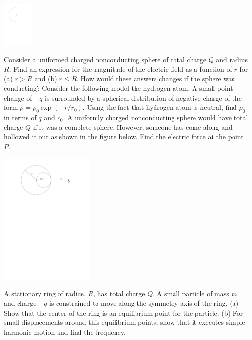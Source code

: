 \documentclass[12pt]{article}
\begin{document}
\includegraphics[width=0.12\textwidth]{semicircle.pdf}


\newpage
\noindent Consider a uniformed charged nonconducting sphere of total charge $Q$ and radius $R$.  Find an expression for the magnitude of the electric field as a function of $r$ for (a) $r>R$ and (b) $r\le R$.  How would these answers changes if the sphere was conducting?
\newpage
\noindent Consider the following model the hydrogen atom.  A small point change of $+q$ is surrounded by a spherical distribution of negative charge of the form $\rho = \rho_0 \exp(-r/r_0)$.  Using the fact that hydrogen atom is neutral, find $\rho_0$ in terms of $q$ and $r_0$.
\newpage
\noindent A uniformly charged nonconducting sphere would have total charge $Q$ if it was a complete sphere.  However, someone has come along and hollowed it out as shown in the figure below.  Find the electric force at the point $P$.

\includegraphics[width=0.35\textwidth]{sphere.pdf}

\newpage
\noindent A stationary ring of radius, $R$, has total charge $Q$.  A small particle of mass $m$ and charge $-q$ is constrained to move along the symmetry axis of the ring.  (a) Show that the center of the ring is an equilibrium point for the particle. (b) For small displacements around this equilibrium points, show that it executes simple harmonic motion and find the frequency.    
\end{document}
